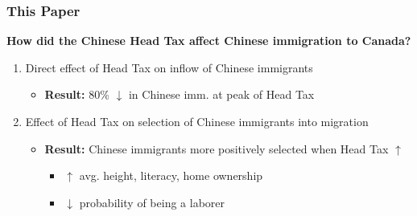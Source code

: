 \documentclass[xcolor=dvipsnames, compress, 12pt, aspectratio=169, handout]{beamer}
\begin{document}
\begin{frame}
    \frametitle{This Paper}
    \textbf{How did the Chinese Head Tax affect Chinese immigration to Canada?}
    \vspace{2mm}
    \begin{enumerate}
        \item Direct effect of Head Tax on inflow of Chinese immigrants 
        \vspace{3mm}
        \begin{itemize}
            \item \textbf{Result:} 80\% $\downarrow$ in Chinese imm. at peak of Head Tax
        \end{itemize}
        \vspace{3mm}
        \item Effect of Head Tax on selection of Chinese immigrants into migration 
        \vspace{2mm}
        \begin{itemize}
            \item \textbf{Result:} Chinese immigrants more positively selected when Head Tax $\uparrow$
            \vspace{1mm}
            \begin{itemize}
                \item $\uparrow$ avg. height, literacy, home ownership \vspace{1mm}
                \item $\downarrow$ probability of being a laborer
            \end{itemize}
        \end{itemize}
    \end{enumerate}
\end{frame}
\end{document}
